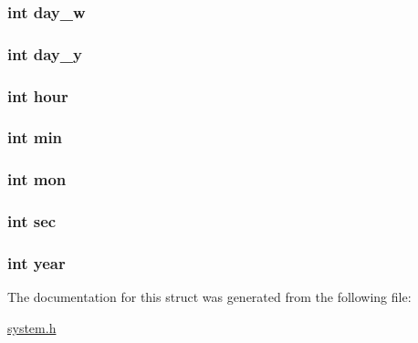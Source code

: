 \subsubsection[{day\+\_\+w}]{\setlength{\rightskip}{0pt plus 5cm}int day\+\_\+w}\label{structdate__time_a65f1a8d2d8998298122653d29b282039}
\hypertarget{structdate__time_ae32b944876e247e9a9fae3371d54c71f}{}
\subsubsection[{day\+\_\+y}]{\setlength{\rightskip}{0pt plus 5cm}int day\+\_\+y}\label{structdate__time_ae32b944876e247e9a9fae3371d54c71f}
\hypertarget{structdate__time_a15df9ba285cfd842f284025f904edc9c}{}
\subsubsection[{hour}]{\setlength{\rightskip}{0pt plus 5cm}int hour}\label{structdate__time_a15df9ba285cfd842f284025f904edc9c}
\hypertarget{structdate__time_a3e202b201e6255d975cd6d3aff1f5a4d}{}
\subsubsection[{min}]{\setlength{\rightskip}{0pt plus 5cm}int min}\label{structdate__time_a3e202b201e6255d975cd6d3aff1f5a4d}
\hypertarget{structdate__time_a25b602fa15f03b01f61a900f1f68a67d}{}
\subsubsection[{mon}]{\setlength{\rightskip}{0pt plus 5cm}int mon}\label{structdate__time_a25b602fa15f03b01f61a900f1f68a67d}
\hypertarget{structdate__time_a90c2ace84e5523d06b7162ea5928acc1}{}
\subsubsection[{sec}]{\setlength{\rightskip}{0pt plus 5cm}int sec}\label{structdate__time_a90c2ace84e5523d06b7162ea5928acc1}
\hypertarget{structdate__time_abeac221e38b7b9ce7df8722c842bf671}{}
\subsubsection[{year}]{\setlength{\rightskip}{0pt plus 5cm}int year}\label{structdate__time_abeac221e38b7b9ce7df8722c842bf671}


The documentation for this struct was generated from the following file\+:\begin{DoxyCompactItemize}
\item 
\hyperlink{system_8h}{system.\+h}\end{DoxyCompactItemize}
